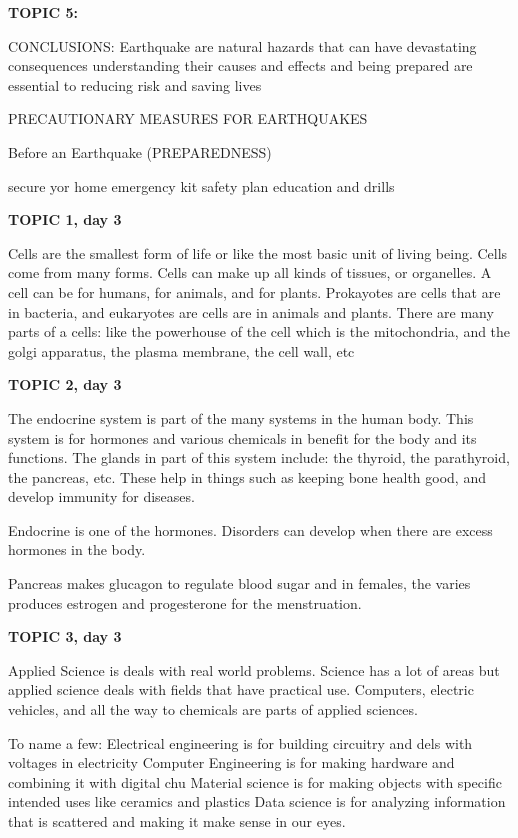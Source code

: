 {{\textbf{TOPIC 5:}


CONCLUSIONS:
Earthquake are natural hazards that can have devastating consequences understanding their causes and effects and being prepared are essential to reducing risk and saving lives 


PRECAUTIONARY MEASURES FOR EARTHQUAKES


Before an Earthquake (PREPAREDNESS)


secure yor home
emergency kit
safety plan
education and drills

\textbf{TOPIC 1, day 3}


Cells are the smallest form of life or like the most basic unit of living being. Cells come from many forms. Cells can make up all kinds of tissues, or organelles. A cell can be for humans, for animals, and for plants. Prokayotes are cells that are in bacteria, and eukaryotes are cells are in animals and plants. There are many parts of a cells: like the powerhouse of the cell which is the mitochondria, and the golgi apparatus, the plasma membrane, the cell wall, etc

\textbf{TOPIC 2, day 3}


The endocrine system is part of the many systems in the human body. This system is for hormones and various chemicals in benefit for the body and its functions. The glands in part of this system include: the thyroid, the parathyroid, the pancreas, etc. These help in things such as keeping bone health good, and develop immunity for diseases. 

Endocrine is one of the hormones. Disorders can develop when there are excess hormones in the body. 

Pancreas makes glucagon to regulate blood sugar and in females, the varies produces estrogen and progesterone for the menstruation.

\textbf{TOPIC 3, day 3}




Applied Science is deals with real world problems. Science has a lot of areas but applied science deals with fields that have practical use. Computers, electric vehicles, and all the way to chemicals are parts of applied sciences. 

To name a few: 
Electrical engineering is for building circuitry and dels with voltages in electricity
Computer Engineering is for making hardware and combining it with digital chu
Material science is for making objects with specific intended uses like ceramics and plastics
Data science is for analyzing information that is scattered and making it make sense in our eyes.

}}
